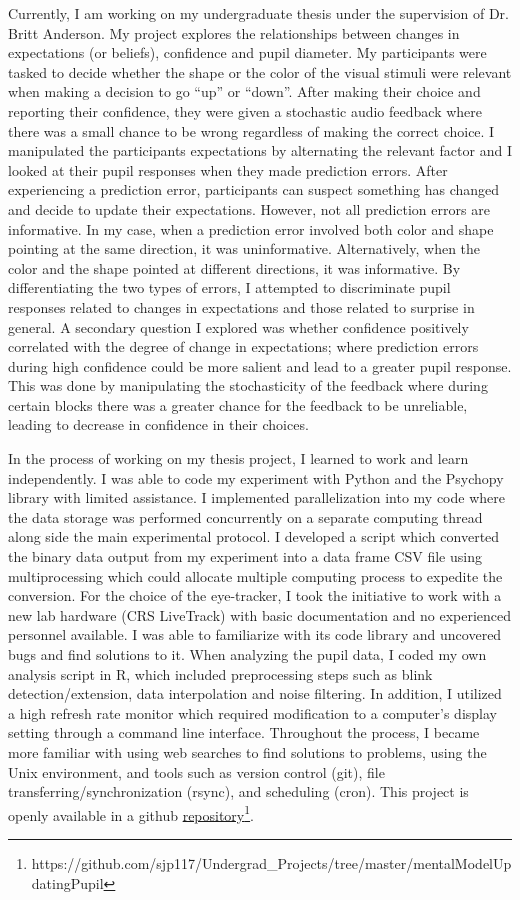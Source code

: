 \documentclass[12pt]{article}
\begin{document}
Currently, I am working on my undergraduate thesis under the supervision of Dr. Britt Anderson. My project explores the relationships between changes in expectations (or beliefs), confidence and pupil diameter. My participants were tasked to decide whether the shape or the color of the visual stimuli were relevant when making a decision to go “up” or “down”. After making their choice and reporting their confidence, they were given a stochastic audio feedback where there was a small chance to be wrong regardless of making the correct choice. I manipulated the participants expectations by alternating the relevant factor and I looked at their pupil responses when they made prediction errors. After experiencing a prediction error, participants can suspect something has changed and decide to update their expectations. However, not all prediction errors are informative. In my case, when a prediction error involved both color and shape pointing at the same direction, it was uninformative. Alternatively, when the color and the shape pointed at different directions, it was informative. By differentiating the two types of errors, I attempted to discriminate pupil responses related to changes in expectations and those related to surprise in general. A secondary question I explored was whether confidence positively correlated with the degree of change in expectations; where prediction errors during high confidence could be more salient and lead to a greater pupil response. This was done by manipulating the stochasticity of the feedback where during certain blocks there was a greater chance for the feedback to be unreliable, leading to decrease in confidence in their choices.

In the process of working on my thesis project, I learned to work and learn independently. I was able to code my experiment with Python and the Psychopy library with limited assistance. I implemented parallelization into my code where the data storage was performed concurrently on a separate computing thread along side the main experimental protocol. I developed a script which converted the binary data output from my experiment into a data frame CSV file using multiprocessing which could allocate multiple computing process to expedite the conversion. For the choice of the eye-tracker, I took the initiative to work with a new lab hardware (CRS LiveTrack) with basic documentation and no experienced personnel available. I was able to familiarize with its code library and uncovered bugs and find solutions to it. When analyzing the pupil data, I coded my own analysis script in R, which included preprocessing steps such as blink detection/extension, data interpolation and noise filtering. In addition, I utilized a high refresh rate monitor which required modification to a computer’s display setting through a command line interface. Throughout the process, I became more familiar with using web searches to find solutions to problems, using the Unix environment, and tools such as version control (git), file transferring/synchronization (rsync), and scheduling (cron). This project is openly available in a github \href{https://github.com/sjp117/Undergrad_Projects/tree/master/mentalModelUpdatingPupil}{repository}\footnote{https://github.com/sjp117/Undergrad\_Projects/tree/master/mentalModelUpdatingPupil}.
\end{document}
